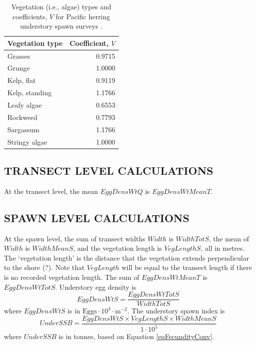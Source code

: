 \documentclass[12pt]{article}
\begin{document}
\begin{table}
\centering
\caption[Vegetation (i.e., algae) types and coefficients for Pacific herring understory spawn surveys]
{Vegetation (i.e., algae) types and coefficients, $V$ for Pacific herring understory spawn surveys \citep{Schweigert2005}.}
\begin{tabular}{lr}
\toprule
Vegetation type & Coefficient, $V$\\
\midrule
Grasses & 0.9715 \\
Grunge & 1.0000 \\
Kelp, flat & 0.9119 \\
Kelp, standing & 1.1766 \\
Leafy algae & 0.6553 \\
Rockweed & 0.7793 \\
Sargassum & 1.1766 \\
Stringy algae & 1.0000 \\
\bottomrule
\end{tabular}
\label{tabVegTypes}
\end{table}

\subsection{TRANSECT LEVEL CALCULATIONS}

At the transect level, the mean $EggDensWtQ$ is $EggDensWtMeanT$.

\subsection{SPAWN LEVEL CALCULATIONS}

At the spawn level, the sum of transect widths $Width$ is $WidthTotS$, the mean of $Width$ is $WidthMeanS$, and the vegetation length is $VegLengthS$, all in metres.
The `vegetation length' is the distance that the vegetation extends perpendicular to the shore (?).
Note that $VegLength$ will be equal to the transect length if there is no recorded vegetation length.
The sum of $EggDensWtMeanT$ is $EggDensWtTotS$.
Understory egg density is 
\begin{equation}
EggDensWtS = \frac{EggDensWtTotS} {WidthTotS}
\label{eqEggDensityUnder}
\end{equation}
where $EggDensWtS$ is in $\text{Eggs} \cdot 10^{3} \cdot \text{m}^{-2}$.
The understory spawn index is
\begin{equation}
UnderSSB = \frac{EggDensWtS \times VegLengthS \times WidthMeanS} {1 \cdot 10^{5}}
\label{eqBiomassUnder}
\end{equation}
where $UnderSSB$ is in tonnes, based on Equation \ref{eqFecundityConv}.
\end{document}

